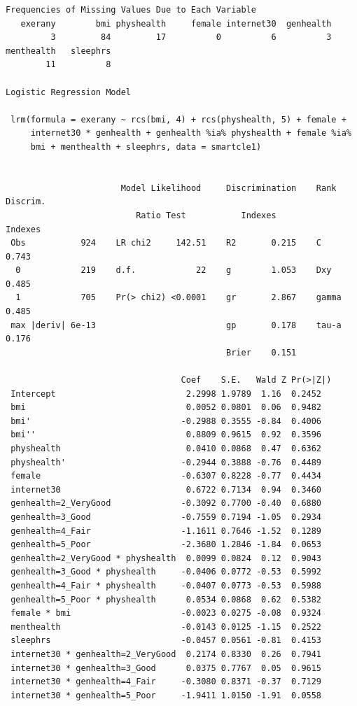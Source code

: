 \documentclass[]{book}
\theoremstyle{definition}
\theoremstyle{definition}
\theoremstyle{definition}
\theoremstyle{remark}
\begin{document}
\begin{verbatim}
Frequencies of Missing Values Due to Each Variable
   exerany        bmi physhealth     female internet30  genhealth 
         3         84         17          0          6          3 
menthealth   sleephrs 
        11          8 

Logistic Regression Model
 
 lrm(formula = exerany ~ rcs(bmi, 4) + rcs(physhealth, 5) + female + 
     internet30 * genhealth + genhealth %ia% physhealth + female %ia% 
     bmi + menthealth + sleephrs, data = smartcle1)
 
 
                       Model Likelihood     Discrimination    Rank Discrim.    
                          Ratio Test           Indexes           Indexes       
 Obs           924    LR chi2     142.51    R2       0.215    C       0.743    
  0            219    d.f.            22    g        1.053    Dxy     0.485    
  1            705    Pr(> chi2) <0.0001    gr       2.867    gamma   0.485    
 max |deriv| 6e-13                          gp       0.178    tau-a   0.176    
                                            Brier    0.151                     
 
                                   Coef    S.E.   Wald Z Pr(>|Z|)
 Intercept                          2.2998 1.9789  1.16  0.2452  
 bmi                                0.0052 0.0801  0.06  0.9482  
 bmi'                              -0.2988 0.3555 -0.84  0.4006  
 bmi''                              0.8809 0.9615  0.92  0.3596  
 physhealth                         0.0410 0.0868  0.47  0.6362  
 physhealth'                       -0.2944 0.3888 -0.76  0.4489  
 female                            -0.6307 0.8228 -0.77  0.4434  
 internet30                         0.6722 0.7134  0.94  0.3460  
 genhealth=2_VeryGood              -0.3092 0.7700 -0.40  0.6880  
 genhealth=3_Good                  -0.7559 0.7194 -1.05  0.2934  
 genhealth=4_Fair                  -1.1611 0.7646 -1.52  0.1289  
 genhealth=5_Poor                  -2.3680 1.2846 -1.84  0.0653  
 genhealth=2_VeryGood * physhealth  0.0099 0.0824  0.12  0.9043  
 genhealth=3_Good * physhealth     -0.0406 0.0772 -0.53  0.5992  
 genhealth=4_Fair * physhealth     -0.0407 0.0773 -0.53  0.5988  
 genhealth=5_Poor * physhealth      0.0534 0.0868  0.62  0.5382  
 female * bmi                      -0.0023 0.0275 -0.08  0.9324  
 menthealth                        -0.0143 0.0125 -1.15  0.2522  
 sleephrs                          -0.0457 0.0561 -0.81  0.4153  
 internet30 * genhealth=2_VeryGood  0.2174 0.8330  0.26  0.7941  
 internet30 * genhealth=3_Good      0.0375 0.7767  0.05  0.9615  
 internet30 * genhealth=4_Fair     -0.3080 0.8371 -0.37  0.7129  
 internet30 * genhealth=5_Poor     -1.9411 1.0150 -1.91  0.0558  
 
\end{verbatim}
\end{document}
